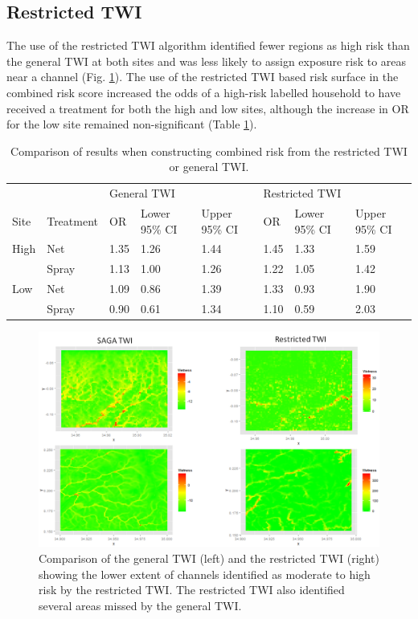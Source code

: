 \documentclass{article}\usepackage[]{graphicx}\usepackage[]{color}
\begin{document}
\subsection{Restricted TWI}

The use of the restricted TWI algorithm identified fewer regions as high risk than the general TWI at both sites and was less likely to assign exposure risk to areas near a channel (Fig. \ref{twis}).  The use of the restricted TWI based risk surface in the combined risk score increased the odds of a high-risk labelled household to have received a treatment for both the high and low sites,  although the increase in OR for the low site remained non-significant (Table \ref{Sens}).

  


\begin{table}[ht]
\centering
\begin{tabular}{llllllll}
  \hline
 &  & \multicolumn{3}{l}{General TWI} & \multicolumn{3}{l}{Restricted TWI}\\
Site & Treatment & OR & Lower 95\% CI & Upper 95\% CI & OR & Lower 95\% CI & Upper 95\% CI \\ 
  \hline
High & Net & 1.35 & 1.26 & 1.44 & 1.45 & 1.33 & 1.59 \\ 
   & Spray & 1.13 & 1.00 & 1.26 & 1.22 & 1.05 & 1.42 \\ 
  Low & Net & 1.09 & 0.86 & 1.39 & 1.33 & 0.93 & 1.90 \\ 
   & Spray & 0.90 & 0.61 & 1.34 & 1.10 & 0.59 & 2.03 \\ 
   \hline
\end{tabular}
\caption{Comparison of results when constructing combined risk from the restricted TWI or general TWI.} 
\label{Sens}
\end{table}

\begin{figure}
\centering
\includegraphics[scale=.5]{./figure/CompareTWI.png}
\caption{Comparison of the general TWI (left) and the restricted TWI (right) showing the lower extent of channels identified as moderate to high risk by the restricted TWI.  The restricted TWI also identified several areas missed by the general TWI. }
\label{twis}
\end{figure}
\end{document}
